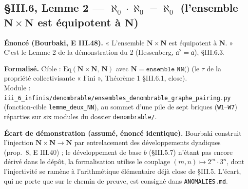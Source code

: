 \subsection{§III.6, Lemme 2 --- $\aleph_0 \cdot \aleph_0 = \aleph_0$ (l'ensemble $\mathbf{N}\times\mathbf{N}$ est équipotent à $\mathbf{N}$)}
\textbf{Énoncé (Bourbaki, E III.48).} « L'ensemble $\mathbf{N}\times\mathbf{N}$ est
équipotent à $\mathbf{N}$. » C'est le Lemme 2 de la démonstration du \theoreme{} 2
(Hessenberg, $\mathfrak{a}^2=\mathfrak{a}$), §III.6.3.

\textbf{Formalisé.} Cible : $\mathrm{Eq}(\mathbf{N}\times\mathbf{N},\,\mathbf{N})$ avec
$\mathbf{N} = \texttt{ensemble\_NN()}$ (le $\tau$ de la propriété collectivisante
« $\mathrm{Fini}$ », Théorème 1 §III.6.1, close). \\
Module : \texttt{iii\_6\_infinis/denombrable/ensembles\_denombrable\_graphe\_pairing.py}
(fonction-cible \texttt{lemme\_deux\_NN}), au sommet d'une pile de sept briques
(\texttt{W1}--\texttt{W7}) réparties sur six modules du dossier \texttt{denombrable/}.

\textbf{Écart de démonstration (assumé, énoncé identique).} Bourbaki construit
l'injection $\mathbf{N}\times\mathbf{N}\to\mathbf{N}$ par entrelacement des
développements dyadiques (prop.~8, E III.40) ; le développement de base $b$
(§III.5.7) n'étant pas encore dérivé dans le dépôt, la formalisation utilise le
couplage $(m,n)\mapsto 2^{m}\cdot 3^{n}$, dont l'injectivité se ramène à
l'arithmétique élémentaire déjà close de §III.5. L'écart, qui ne porte que sur le
chemin de preuve, est consigné dans \texttt{ANOMALIES.md}.


